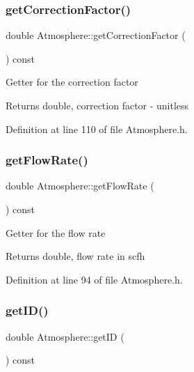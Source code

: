 \subsubsection{\texorpdfstring{get\+Correction\+Factor()}{getCorrectionFactor()}}
{\footnotesize\ttfamily double Atmosphere\+::get\+Correction\+Factor (\begin{DoxyParamCaption}{ }\end{DoxyParamCaption}) const\hspace{0.3cm}{\ttfamily [inline]}}

Getter for the correction factor \begin{DoxyReturn}{Returns}
double, correction factor -\/ unitless 
\end{DoxyReturn}


Definition at line 110 of file Atmosphere.\+h.

\mbox{\label{class_atmosphere_ad34708b12c8c9af4fce47669d68ebf4d}} 
\subsubsection{\texorpdfstring{get\+Flow\+Rate()}{getFlowRate()}}
{\footnotesize\ttfamily double Atmosphere\+::get\+Flow\+Rate (\begin{DoxyParamCaption}{ }\end{DoxyParamCaption}) const\hspace{0.3cm}{\ttfamily [inline]}}

Getter for the flow rate \begin{DoxyReturn}{Returns}
double, flow rate in scfh 
\end{DoxyReturn}


Definition at line 94 of file Atmosphere.\+h.

\mbox{\label{class_atmosphere_a4dfda799563c28438db1b23cbee6e099}} 
\subsubsection{\texorpdfstring{get\+I\+D()}{getID()}}
{\footnotesize\ttfamily double Atmosphere\+::get\+ID (\begin{DoxyParamCaption}{ }\end{DoxyParamCaption}) const\hspace{0.3cm}{\ttfamily [inline]}}

